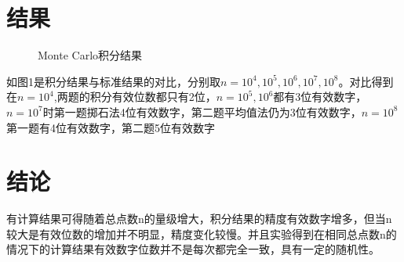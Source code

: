 \documentclass{article}
\begin{document}
	\section{结果}
\begin{figure}[!h]
	\centering
	\caption{\heiti{}Monte Carlo积分结果}
	
\end{figure}
	如图1是积分结果与标准结果的对比，分别取$ n=10^4,10^5,10^6,10^7,10^8 $。对比得到在$ n=10^4 $,两题的积分有效位数都只有2位，$ n=10^5,10^6 $都有3位有效数字，$ n=10^7 $时第一题掷石法4位有效数字，第二题平均值法仍为3位有效数字，$ n=10^8 $第一题有4位有效数字，第二题5位有效数字
	\section{结论}
	有计算结果可得随着总点数n的量级增大，积分结果的精度有效数字增多，但当n较大是有效位数的增加并不明显，精度变化较慢。并且实验得到在相同总点数n的情况下的计算结果有效数字位数并不是每次都完全一致，具有一定的随机性。
\end{document}
